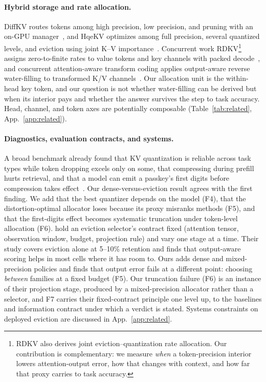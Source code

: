 \documentclass{article}
\theoremstyle{definition}
\begin{document}
\paragraph{Hybrid storage and rate allocation.}
DiffKV routes tokens among high precision, low precision, and pruning with an on-GPU manager~\citep{zhang2025diffkv}, and HqeKV optimizes among full precision, several quantized levels, and eviction using joint K--V importance~\citep{wang-etal-2026-hqekv}.  
Concurrent work RDKV\footnote{RDKV also derives joint eviction--quantization rate allocation.  Our contribution is complementary: we measure \emph{when} a token-precision interior lowers attention-output error, how that changes with context, and how far that proxy carries to task accuracy.
} assigns zero-to-finite rates to value tokens and key channels with packed decode~\citep{zhang2026rdkv}, and concurrent attention-aware transform coding applies output-aware reverse water-filling to transformed K/V channels~\citep{laus2026aatc}.  
Our allocation unit is the within-head key token, and our question is not whether water-filling can be derived but when its interior pays and whether the answer survives the step to task accuracy.  Head, channel, and token axes are potentially composable (Table~\ref{tab:related}, App.~\ref{app:related}).

\paragraph{Diagnostics, evaluation contracts, and systems.}
A broad benchmark already found that KV quantization is reliable across task types while token dropping excels only on some, that compressing during prefill hurts retrieval, and that a model can emit a passkey's first digits before compression takes effect~\citep{yuan2024kvbench}.  
Our dense-versus-eviction result agrees with the first finding.  We add that the best quantizer depends on the model (F4), that the distortion-optimal allocator loses because its proxy misranks methods (F5), and that the first-digits effect becomes systematic truncation under token-level allocation (F6).
\citet{zhang2026fixedcontract} hold an eviction selector's contract fixed (attention tensor, observation window, budget, projection rule) and vary one stage at a time. %
Their study covers eviction alone at 5--10\% retention and finds that output-aware scoring helps in most cells where it has room to.  
Ours adds dense and mixed-precision policies and finds that output error fails at a different point: choosing \emph{between} families at a fixed budget (F5).  
Our truncation failure (F6) is an instance of their projection stage, produced by a mixed-precision allocator rather than a selector, and F7 carries their fixed-contract principle one level up, to the baselines and information contract under which a verdict is stated.
Systems constraints on deployed eviction are discussed in App.~\ref{app:related}.
\end{document}
